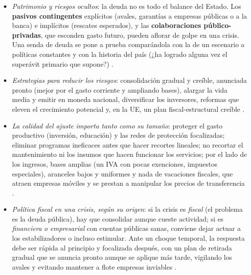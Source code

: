 \documentclass[11pt]{article}
\begin{document}
\begin{itemize}
\begin{itemize}
  \item con \textbf{el sector no bancario}: tipos más altos y, si la deuda no se controla, inflación futura.
  \end{itemize}
\item \emph{Patrimonio y riesgos ocultos}: la deuda no es todo el balance del Estado. Los \textbf{pasivos contingentes} explícitos (avales, garantías a empresas públicas o a la banca) e implícitos (rescates esperados), y las \textbf{colaboraciones público-privadas}, que esconden gasto futuro, pueden aflorar de golpe en una crisis. Una senda de deuda se pone a prueba comparándola con la de un escenario a políticas constantes y con la historia del país (¿ha logrado alguna vez el superávit primario que supone?) \parencite{FMI2013CaseStudy,FMI2021DSA}.
\item \emph{Estrategias para reducir los riesgos}: consolidación gradual y creíble, anunciada pronto (mejor por el gasto corriente y ampliando bases), alargar la vida media y emitir en moneda nacional, diversificar los inversores, reformas que eleven el crecimiento potencial y, en la UE, un plan fiscal-estructural creíble .
\item \emph{La calidad del ajuste importa tanto como su tamaño}: proteger el gasto productivo (inversión, educación) y las redes de protección focalizadas; eliminar programas ineficaces antes que hacer recortes lineales; no recortar el mantenimiento ni los insumos que hacen funcionar los servicios; por el lado de los ingresos, bases amplias (un IVA con pocas exenciones, impuestos especiales), aranceles bajos y uniformes y nada de vacaciones fiscales, que atraen empresas móviles y se prestan a manipular los precios de transferencia \parencite{FMI2013CaseStudy}.
\item \emph{Política fiscal en una crisis, según su origen}: si la crisis es \emph{fiscal} (el problema es la deuda pública), hay que consolidar aunque cueste actividad; si es \emph{financiera o empresarial} con cuentas públicas sanas, conviene dejar actuar a los estabilizadores o incluso estimular. Ante un choque temporal, la respuesta debe ser rápida al principio y focalizada después, con un plan de retirada gradual que se anuncia pronto aunque se aplique más tarde, vigilando los avales y evitando mantener a flote empresas inviables \parencite{FMI2013CaseStudy}.
\end{itemize}
\end{document}
